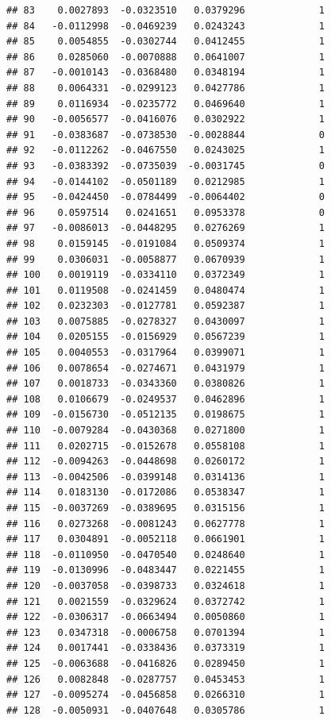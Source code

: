 \documentclass[12pt]{article}\usepackage[]{graphicx}\usepackage[]{xcolor}
\makeatletter
\newenvironment{kframe}{%
 \def\at@end@of@kframe{}%
 \ifinner\ifhmode%
  \def\at@end@of@kframe{\end{minipage}}%
  \begin{minipage}{\columnwidth}%
 \fi\fi%
 \def\FrameCommand##1{\hskip\@totalleftmargin \hskip-\fboxsep
 \colorbox{shadecolor}{##1}\hskip-\fboxsep
     \hskip-\linewidth \hskip-\@totalleftmargin \hskip\columnwidth}%
 \MakeFramed {\advance\hsize-\width
   \@totalleftmargin\z@ \linewidth\hsize
   \@setminipage}}%
 {\par\unskip\endMakeFramed%
 \at@end@of@kframe}
\newenvironment{knitrout}{}{} %
\makeatother
\begin{document}
\begin{knitrout}
\begin{kframe}
\begin{verbatim}
## 83    0.0027893  -0.0323510   0.0379296             1
## 84   -0.0112998  -0.0469239   0.0243243             1
## 85    0.0054855  -0.0302744   0.0412455             1
## 86    0.0285060  -0.0070888   0.0641007             1
## 87   -0.0010143  -0.0368480   0.0348194             1
## 88    0.0064331  -0.0299123   0.0427786             1
## 89    0.0116934  -0.0235772   0.0469640             1
## 90   -0.0056577  -0.0416076   0.0302922             1
## 91   -0.0383687  -0.0738530  -0.0028844             0
## 92   -0.0112262  -0.0467550   0.0243025             1
## 93   -0.0383392  -0.0735039  -0.0031745             0
## 94   -0.0144102  -0.0501189   0.0212985             1
## 95   -0.0424450  -0.0784499  -0.0064402             0
## 96    0.0597514   0.0241651   0.0953378             0
## 97   -0.0086013  -0.0448295   0.0276269             1
## 98    0.0159145  -0.0191084   0.0509374             1
## 99    0.0306031  -0.0058877   0.0670939             1
## 100   0.0019119  -0.0334110   0.0372349             1
## 101   0.0119508  -0.0241459   0.0480474             1
## 102   0.0232303  -0.0127781   0.0592387             1
## 103   0.0075885  -0.0278327   0.0430097             1
## 104   0.0205155  -0.0156929   0.0567239             1
## 105   0.0040553  -0.0317964   0.0399071             1
## 106   0.0078654  -0.0274671   0.0431979             1
## 107   0.0018733  -0.0343360   0.0380826             1
## 108   0.0106679  -0.0249537   0.0462896             1
## 109  -0.0156730  -0.0512135   0.0198675             1
## 110  -0.0079284  -0.0430368   0.0271800             1
## 111   0.0202715  -0.0152678   0.0558108             1
## 112  -0.0094263  -0.0448698   0.0260172             1
## 113  -0.0042506  -0.0399148   0.0314136             1
## 114   0.0183130  -0.0172086   0.0538347             1
## 115  -0.0037269  -0.0389695   0.0315156             1
## 116   0.0273268  -0.0081243   0.0627778             1
## 117   0.0304891  -0.0052118   0.0661901             1
## 118  -0.0110950  -0.0470540   0.0248640             1
## 119  -0.0130996  -0.0483447   0.0221455             1
## 120  -0.0037058  -0.0398733   0.0324618             1
## 121   0.0021559  -0.0329624   0.0372742             1
## 122  -0.0306317  -0.0663494   0.0050860             1
## 123   0.0347318  -0.0006758   0.0701394             1
## 124   0.0017441  -0.0338436   0.0373319             1
## 125  -0.0063688  -0.0416826   0.0289450             1
## 126   0.0082848  -0.0287757   0.0453453             1
## 127  -0.0095274  -0.0456858   0.0266310             1
## 128  -0.0050931  -0.0407648   0.0305786             1

\end{verbatim}
\end{kframe}
\end{knitrout}
\end{document}
